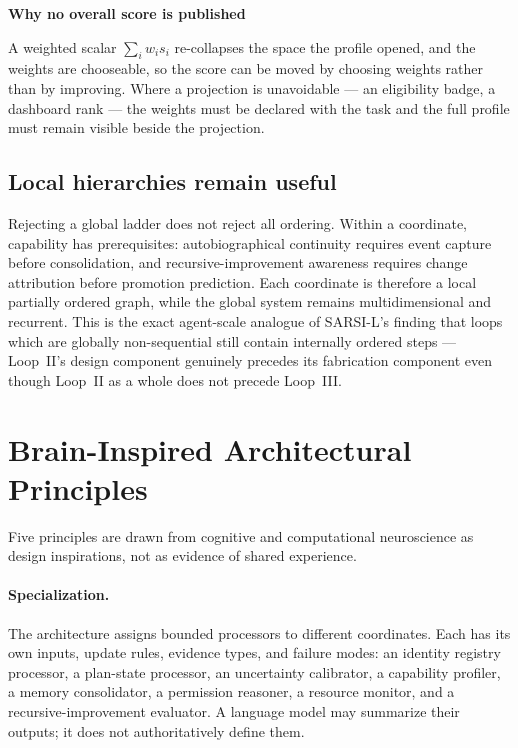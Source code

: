 \documentclass[11pt]{article}
\newenvironment{claimbox}[1]{%
  \begin{shaded}\noindent\textbf{#1}\par\smallskip}{%
  \end{shaded}}
\begin{document}
\begin{claimbox}{Why no overall score is published}
A weighted scalar $\sum_i w_i s_i$ re-collapses the space the profile opened, and the weights are chooseable, so the score can be moved by choosing weights rather than by improving. Where a projection is unavoidable --- an eligibility badge, a dashboard rank --- the weights must be declared with the task and the full profile must remain visible beside the projection.
\end{claimbox}

\subsection{Local hierarchies remain useful}
Rejecting a global ladder does not reject all ordering. Within a coordinate, capability has prerequisites: autobiographical continuity requires event capture before consolidation, and recursive-improvement awareness requires change attribution before promotion prediction. Each coordinate is therefore a local partially ordered graph, while the global system remains multidimensional and recurrent. This is the exact agent-scale analogue of SARSI-L's finding that loops which are globally non-sequential still contain internally ordered steps --- Loop~II's design component genuinely precedes its fabrication component even though Loop~II as a whole does not precede Loop~III.

\section{Brain-Inspired Architectural Principles}
\label{sec:principles}

Five principles are drawn from cognitive and computational neuroscience as design inspirations, not as evidence of shared experience.

\paragraph{Specialization.} The architecture assigns bounded processors to different coordinates. Each has its own inputs, update rules, evidence types, and failure modes: an identity registry processor, a plan-state processor, an uncertainty calibrator, a capability profiler, a memory consolidator, a permission reasoner, a resource monitor, and a recursive-improvement evaluator. A language model may summarize their outputs; it does not authoritatively define them.
\end{document}
